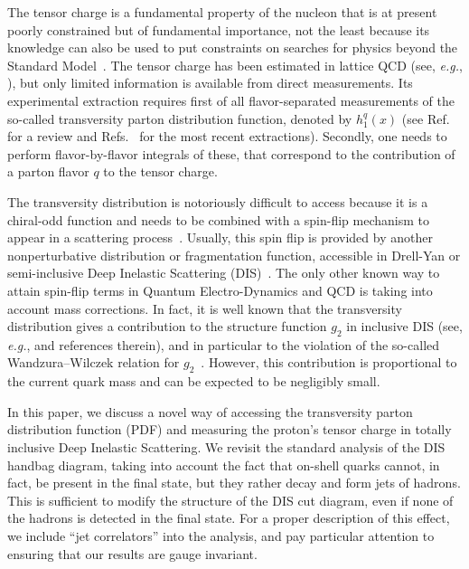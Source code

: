 \documentclass[preprintnumbers,floatfix,nofootinbib]{revtex4}
\newcommand{\eg}{{\em e.g.}}
\begin{document}
The tensor charge is a fundamental property of the nucleon that is at
present poorly constrained but of fundamental importance, not the least because its knowledge can also be used to put constraints on searches for physics beyond the Standard Model~\cite{Cirigliano:2013xha,Bhattacharya:2015esa,Courtoy:2015haa}.
The tensor charge has been estimated in lattice QCD (see, \eg,
\cite{Green:2012ej,Bali:2014nma,Bhattacharya:2015wna,Abdel-Rehim:2015owa,Bhattacharya:2016zcn}), but
only limited information is available from direct measurements. Its experimental extraction requires first of all flavor-separated measurements of the so-called transversity parton distribution function,
denoted by $h_1^q(x)$ (see Ref.~\cite{Barone:2001sp} for a review and
Refs.~\cite{Radici:2015mwa,Anselmino:2015sxa,Kang:2015msa} for the most recent
extractions). Secondly, one needs to perform flavor-by-flavor integrals of these, that correspond to the contribution of a parton flavor $q$ to the tensor charge. 

The transversity distribution is notoriously difficult to access because it is
a chiral-odd function and needs to be combined with a spin-flip mechanism to
appear in a scattering process~\cite{Jaffe:1996zw}. Usually, this spin flip is provided by another
nonperturbative distribution or fragmentation function, accessible in Drell-Yan or semi-inclusive Deep Inelastic Scattering (DIS)~\cite{Ralston:1979ys,Jaffe:1991kp,Jaffe:1993xb,Collins:1992kk}.
The only other known way to attain spin-flip terms in Quantum Electro-Dynamics and QCD is taking into account mass corrections. In fact, it is well known that the transversity distribution gives a contribution to the structure function $g_2$ in inclusive DIS (see, \eg, \cite{Accardi:2009au} and references therein), and in particular to the violation of the so-called Wandzura--Wilczek relation for $g_2$~\cite{Wandzura:1977qf}. However, this contribution is proportional to the current quark mass and can be expected to be negligibly small.


In this paper, we discuss a novel way of accessing the transversity parton distribution function (PDF) and measuring the proton's tensor charge in totally inclusive Deep Inelastic Scattering. 
We revisit the standard analysis of the DIS handbag diagram, taking into account the fact that on-shell quarks cannot, in fact, be present in the final state, but they rather decay and form jets of hadrons. This is sufficient to modify the structure of the DIS
cut diagram, even if none of the hadrons is detected in the final
state. For a proper description of this effect, we include ``jet
correlators'' into the analysis, and pay particular attention to ensuring that our results are gauge invariant.
\end{document}
